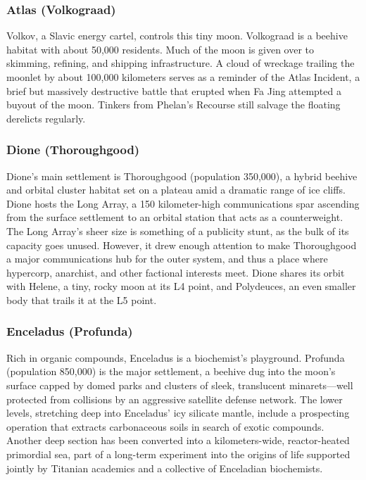 \subsubsection{Atlas (Volkograad)}
\label{sec:atlas-volkograad}

Volkov, a Slavic energy cartel, controls this tiny moon. Volkograad is
a beehive habitat with about 50,000 residents. Much of the moon is
given over to skimming, refining, and shipping infrastructure. A cloud
of wreckage trailing the moonlet by about 100,000 kilometers serves as
a reminder of the Atlas Incident, a brief but massively destructive
battle that erupted when Fa Jing attempted a buyout of the
moon. Tinkers from Phelan’s Recourse still salvage the floating
derelicts regularly.

\subsubsection{Dione (Thoroughgood)}
\label{sec:dione-thoroughgood}

Dione’s main settlement is Thoroughgood (population 350,000), a hybrid
beehive and orbital cluster habitat set on a plateau amid a dramatic
range of ice cliffs. Dione hosts the Long Array, a 150 kilometer-high
communications spar ascending from the surface settlement to an
orbital station that acts as a counterweight. The Long Array’s sheer
size is something of a publicity stunt, as the bulk of its capacity
goes unused. However, it drew enough attention to make Thoroughgood a
major communications hub for the outer system, and thus a place where
hypercorp, anarchist, and other factional interests meet.  Dione
shares its orbit with Helene, a tiny, rocky moon at its L4 point, and
Polydeuces, an even smaller body that trails it at the L5 point.

\subsubsection{Enceladus (Profunda)}
\label{sec:enceladus-profunda}

Rich in organic compounds, Enceladus is a biochemist’s
playground. Profunda (population 850,000) is the major settlement, a
beehive dug into the moon’s surface capped by domed parks and clusters
of sleek, translucent minarets—well protected from collisions by an
aggressive satellite defense network. The lower levels, stretching
deep into Enceladus’ icy silicate mantle, include a prospecting
operation that extracts carbonaceous soils in search of exotic
compounds. Another deep section has been converted into a
kilometers-wide, reactor-heated primordial sea, part of a long-term
experiment into the origins of life supported jointly by Titanian
academics and a collective of Enceladian biochemists.

